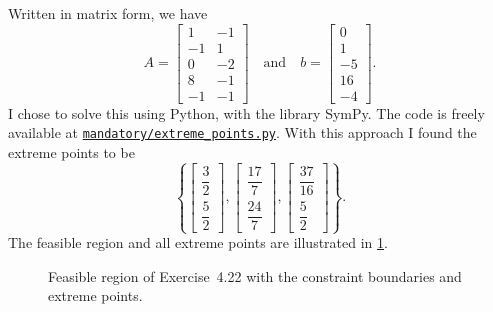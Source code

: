 \documentclass[
  a4paper,
  12pt,
]{article}
\numberwithin{equation}{section}
\begin{document}
\begin{solution}
  Written in matrix form, we have
  \begin{equation}
    A =
    \begin{bmatrix}
      1 & -1 \\
      -1 & 1 \\
      0 & -2 \\
      8 & -1 \\
      -1 & -1
    \end{bmatrix}
    \quad\text{and}\quad
    b =
    \begin{bmatrix}
      0 \\
      1 \\
      -5 \\
      16 \\
      -4
    \end{bmatrix}.
  \end{equation}
  I chose to solve this using Python, with the library SymPy.
  The code is freely available at \href{https://github.com/augustfe/MAT4120/blob/main/mandatory/extreme_points.py}{\texttt{mandatory/extreme\_points.py}}.
  With this approach I found the extreme points to be
  \begin{equation}
    \left\{
      \begin{bmatrix} \dfrac{3}{2} \\ \dfrac{5}{2}
      \end{bmatrix},
      \begin{bmatrix} \dfrac{17}{7} \\ \dfrac{24}{7}
      \end{bmatrix},
      \begin{bmatrix} \dfrac{37}{16} \\ \dfrac{5}{2}
      \end{bmatrix}
    \right\}.
  \end{equation}
  The feasible region and all extreme points are illustrated in \cref{fig:exercise422-feasible-region}.

  \begin{figure}[h]
    \centering
    
    \caption{Feasible region of Exercise~4.22 with the constraint boundaries and extreme points.}\label{fig:exercise422-feasible-region}
  \end{figure}
\end{solution}
\end{document}
